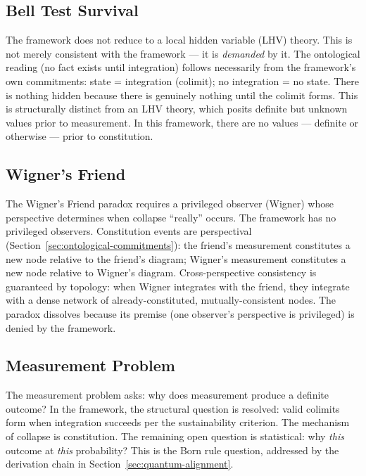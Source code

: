 \documentclass[12pt,a4paper]{article}
\begin{document}
\subsection{Bell Test Survival}
\label{sec:bell-test}

The framework does not reduce to a local hidden variable (LHV) theory. This is not merely consistent with the framework --- it is \emph{demanded} by it. The ontological reading (no fact exists until integration) follows necessarily from the framework's own commitments: state = integration (colimit); no integration = no state. There is nothing hidden because there is genuinely nothing until the colimit forms. This is structurally distinct from an LHV theory, which posits definite but unknown values prior to measurement. In this framework, there are no values --- definite or otherwise --- prior to constitution.

\subsection{Wigner's Friend}
\label{sec:wigner}

The Wigner's Friend paradox requires a privileged observer (Wigner) whose perspective determines when collapse ``really'' occurs. The framework has no privileged observers. Constitution events are perspectival (Section~\ref{sec:ontological-commitments}): the friend's measurement constitutes a new node relative to the friend's diagram; Wigner's measurement constitutes a new node relative to Wigner's diagram. Cross-perspective consistency is guaranteed by topology: when Wigner integrates with the friend, they integrate with a dense network of already-constituted, mutually-consistent nodes. The paradox dissolves because its premise (one observer's perspective is privileged) is denied by the framework.

\subsection{Measurement Problem}
\label{sec:measurement}

The measurement problem asks: why does measurement produce a definite outcome? In the framework, the structural question is resolved: valid colimits form when integration succeeds per the sustainability criterion. The mechanism of collapse is constitution. The remaining open question is statistical: why \emph{this} outcome at \emph{this} probability? This is the Born rule question, addressed by the derivation chain in Section~\ref{sec:quantum-alignment}.
\end{document}
